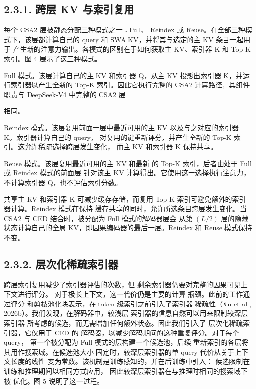 \subsection{2.3.1. 跨层 KV 与索引复用}\label{cross-layer-kv-and-index-reuse}

每个 CSA2 层被静态分配三种模式之一：Full、
Reindex 或 Reuse。在全部三种模式下，该层都计算自己的 query
和 SWA KV，并将其与选定的主 KV 条目一起用于
产生新的注意力输出。各模式的区别在于如何获取主
KV、索引器 K 和 Top-K 索引。图 4 展示了这三种模式。

Full 模式。该层计算自己的主 KV 和索引器 Q，从主
KV 投影出索引器 K，并运行索引器以产生全新的 Top-K
索引。因此它执行完整的 CSA2 计算路径，其组件职责与
DeepSeek-V4 中完整的 CSA2 层








相同。

Reindex 模式。该层复用前面一层中最近可用的主 KV
以及与之对应的索引器 K。索引器计算自己的 query，
对复用的键重新评分，并产生全新的 Top-K
索引。这允许稀疏选择跨层发生变化，
而主 KV 和索引器 K 保持共享。

Reuse 模式。该层复用最近可用的主 KV 和最新
的 Top-K 索引，后者由处于 Full 或 Reindex 模式的前面层
针对该主 KV 计算得出。它使用这一选择执行注意力，
不计算索引器 Q，也不评估索引分数。

共享主 KV 和索引器 K 可减少缓存存储，而复用 Top-K
索引可避免额外的索引器计算。Reindex 模式在保持
缓存共享的同时，允许所选条目跨层发生变化。当
CSA2 与 CED 结合时，被分配为 Full 模式的解码器层会
从第 $(L/2)$ 层的隐藏状态计算自己的全局 KV，即因果编码器的最后一层。Reindex
和 Reuse 模式保持不变。

\subsection{2.3.2. 层次化稀疏索引器}\label{hierarchical-sparse-indexer}

跨层索引复用减少了索引器评估的次数，但
剩余索引器仍要对完整的因果可见上下文进行评分。
对于极长上下文，这一代价仍是主要的计算
瓶颈。此前的工作通过评分
和剪枝池化块表示，在 token 级索引之前引入了索引器
稀疏性（Xu et al., 2026b）。我们发现，在解码器中，较浅层
索引器的信息自然可以用来限制较深层索引器
所考虑的候选，而无需增加任何额外状态。因此我们引入了
层次化稀疏索引器，它仅用于 CED 的
解码器，以减少解码期间的这种重复评分。对于每个 query，
第一个被分配为 Full 模式的层构建一个候选池，后续
重新索引的各层将其用作搜索域。在候选池大小
固定时，较深层索引器的单 query 代价从关于上下文长度的线性
变为常数。该机制是训练感知的，并在后训练中引入：
候选限制在训练和推理期间以相同方式应用，
因此较深层索引器在与推理时相同的搜索域下被
优化。图 5
说明了这一过程。





